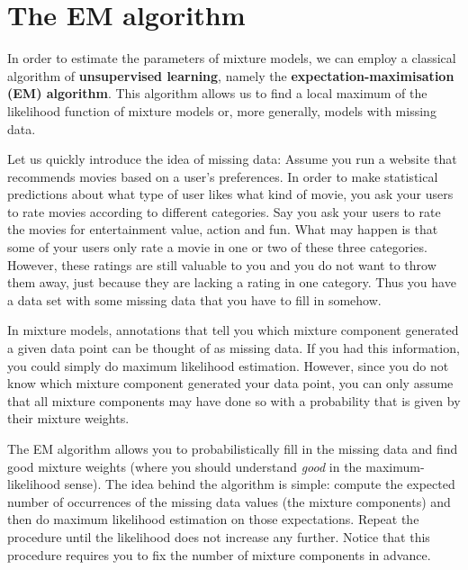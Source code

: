 \section{The EM algorithm}

In order to estimate the parameters of mixture models, we can employ a classical algorithm of 
\textbf{unsupervised learning}, namely the \textbf{expectation-maximisation (EM) algorithm}. This
algorithm allows us to find a local maximum of the likelihood function of mixture models or, more
generally, models with missing data. 

Let us quickly introduce the idea of missing data: Assume you run a website that recommends movies
based on a user's preferences. In order to make statistical predictions about what type of user
likes what kind of movie, you ask your users to rate movies according to different categories.
Say you ask your users to rate the movies for entertainment value, action and fun. What may happen is
that some of your users only rate a movie in one or two of these three categories. However, these
ratings are still valuable to you and you do not want to throw them away, just because they are lacking
a rating in one category. Thus you have a data set with some missing data that you have to fill in somehow.

\medskip 
In mixture models, annotations that tell you which mixture component
generated a given data point can be thought of as missing data. If you had this information, you could simply do maximum likelihood estimation.
However, since you do not know which mixture component generated your data point, you can only
assume that all mixture components may have done so with a probability that is given by their mixture
weights. 

The EM algorithm allows you to probabilistically fill in the missing data and find good mixture weights
(where you should understand \textit{good} in the maximum-likelihood sense). The idea behind the
algorithm is simple: compute the expected number of occurrences of the missing data values (the mixture 
components) and then do maximum likelihood estimation on those expectations. Repeat the procedure 
until the likelihood does not increase any further. Notice that this procedure requires you to
fix the number of mixture components in advance.


